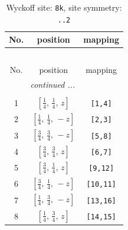 \documentclass[fleqn,8pt]{jsarticle}
\begin{document}
\begin{longtable}{ccc}
\caption{Wyckoff site: {\tt 8k}, site symmetry: {\tt ..2}}
 \\
 \hline \hline
No. & position & mapping \\ \hline \endfirsthead

\multicolumn{2}{l}{\tablename\ \thetable{}} \\
 \hline \hline
No. & position & mapping \\ \hline \endhead

 \hline \hline
\multicolumn{2}{r}{\footnotesize\it continued ...} \\ \endfoot

 \hline \hline
\multicolumn{2}{r}{} \\ \endlastfoot

1 & $\left[ \frac{1}{4},\, \frac{1}{4},\, z \right]$ & {\tt [1,4]} \\ \hline
2 & $\left[ \frac{1}{4},\, \frac{1}{4},\, - z \right]$ & {\tt [2,3]} \\ \hline
3 & $\left[ \frac{3}{4},\, \frac{3}{4},\, - z \right]$ & {\tt [5,8]} \\ \hline
4 & $\left[ \frac{3}{4},\, \frac{3}{4},\, z \right]$ & {\tt [6,7]} \\ \hline
5 & $\left[ \frac{3}{4},\, \frac{1}{4},\, z \right]$ & {\tt [9,12]} \\ \hline
6 & $\left[ \frac{3}{4},\, \frac{1}{4},\, - z \right]$ & {\tt [10,11]} \\ \hline
7 & $\left[ \frac{1}{4},\, \frac{3}{4},\, - z \right]$ & {\tt [13,16]} \\ \hline
8 & $\left[ \frac{1}{4},\, \frac{3}{4},\, z \right]$ & {\tt [14,15]} \\
\end{longtable}
\renewcommand{\arraystretch}{1.2}
\end{document}
